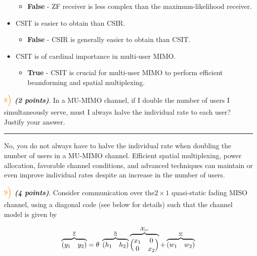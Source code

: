 \documentclass[11pt]{article}
\providecommand{\tightlist}{%
      \setlength{\itemsep}{0pt}\setlength{\parskip}{0pt}}
\begin{document}
\begin{itemize}
  \begin{itemize}
  \tightlist
  \item
    \textbf{False} - ZF receiver is less complex than the
    maximum-likelihood receiver.
  \end{itemize}
\item
  CSIT is easier to obtain than CSIR.

  \begin{itemize}
  \tightlist
  \item
    \textbf{False} - CSIR is generally easier to obtain than CSIT.
  \end{itemize}
\item
  CSIT is of cardinal importance in multi-user MIMO.

  \begin{itemize}
  \tightlist
  \item
    \textbf{True} - CSIT is crucial for multi-user MIMO to perform
    efficient beamforming and spatial multiplexing.
  \end{itemize}
\end{itemize}

    \(\color{orange}8\Bigl)\) \textbf{\emph{(2 points)}}. In a MU-MIMO
channel, if I double the number of users I simultaneously serve, must I
always halve the individual rate to each user? Justify your answer.

    \begin{center}\rule{0.5\linewidth}{0.5pt}\end{center}

No, you do not always have to halve the individual rate when doubling
the number of users in a MU-MIMO channel. Efficient spatial
multiplexing, power allocation, favorable channel conditions, and
advanced techniques can maintain or even improve individual rates
despite an increase in the number of users.

    \(\color{orange}9\Bigl)\) \textbf{\emph{(4 points)}}. Consider
communication over the\(2 \times 1\) quasi-static fading MISO channel,
using a diagonal code (see below for details) such that the channel
model is given by

\[
\overbrace{(y_1 \quad y_2)}^{\underline{y}} = \theta \; \overbrace{(h_1 \quad h_2)}^{\underline{h}} \overbrace{\Bigl(\begin{matrix} x_1&0 \\ 0&x_2 \end{matrix} \Bigr)}^{\mathcal{X}_{tr}} + \overbrace{(w_1 \quad w_2)}^{\underline{w}}
\]
\end{document}

